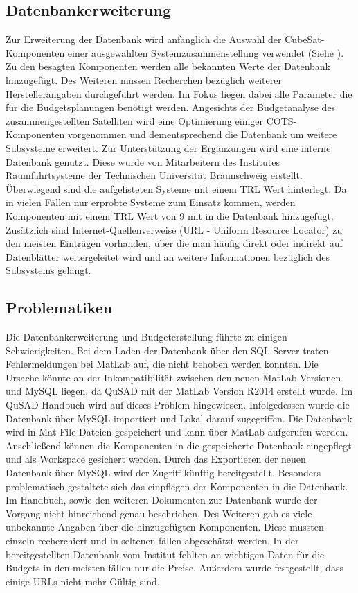 			\subsection{Datenbankerweiterung}
			Zur Erweiterung der Datenbank wird anfänglich die Auswahl der CubeSat-Komponenten einer ausgewählten Systemzusammenstellung verwendet (Siehe ). Zu den besagten Komponenten werden alle bekannten Werte der Datenbank hinzugefügt. Des Weiteren müssen Recherchen bezüglich weiterer Herstellerangaben durchgeführt werden. Im Fokus liegen dabei alle Parameter die für die Budgetsplanungen benötigt werden. Angesichts der Budgetanalyse des zusammengestellten Satelliten wird eine Optimierung einiger COTS-Komponenten vorgenommen und dementsprechend die Datenbank um weitere Subsysteme erweitert. Zur Unterstützung der Ergänzungen wird eine interne Datenbank genutzt. Diese wurde von Mitarbeitern des Institutes Raumfahrtsysteme der Technischen Universität Braunschweig erstellt. Überwiegend sind die aufgelisteten Systeme mit einem TRL Wert hinterlegt. Da in vielen Fällen nur erprobte Systeme zum Einsatz kommen, werden Komponenten mit einem TRL Wert von 9 mit in die Datenbank hinzugefügt. Zusätzlich sind Internet-Quellenverweise (URL - Uniform Resource Locator) zu den meisten Einträgen vorhanden, über die man häufig direkt oder indirekt auf Datenblätter weitergeleitet wird und an weitere Informationen bezüglich des Subsystems gelangt.
			\subsection{Problematiken}
			Die Datenbankerweiterung und Budgeterstellung führte zu einigen Schwierigkeiten. Bei dem Laden der Datenbank über den SQL Server traten Fehlermeldungen bei MatLab auf, die nicht behoben werden konnten. Die Ursache könnte an der Inkompatibilität zwischen den neuen MatLab Versionen und MySQL liegen, da QuSAD mit der MatLab Version R2014 erstellt wurde. Im QuSAD Handbuch wird auf dieses Problem hingewiesen. Infolgedessen wurde die Datenbank über MySQL importiert und Lokal darauf zugegriffen. Die Datenbank wird in Mat-File Dateien gespeichert und kann über MatLab aufgerufen werden. Anschließend können die Komponenten in die gespeicherte Datenbank eingepflegt und als Workspace gesichert werden. Durch das Exportieren der neuen Datenbank über MySQL wird der Zugriff künftig bereitgestellt. Besonders problematisch gestaltete sich das einpflegen der Komponenten in die Datenbank. Im Handbuch, sowie den weiteren Dokumenten zur Datenbank wurde der Vorgang nicht hinreichend genau beschrieben. Des Weiteren gab es viele unbekannte Angaben über die hinzugefügten Komponenten. Diese mussten einzeln recherchiert und in seltenen fällen abgeschätzt werden. In der bereitgestellten Datenbank vom Institut fehlten an wichtigen Daten für die Budgets in den meisten fällen nur die Preise. Außerdem wurde festgestellt, dass einige URLs nicht mehr Gültig sind.
